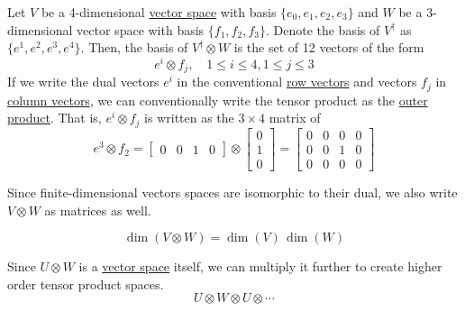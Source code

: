 	\begin{example}
	  \label{ex:4times3-dimensional-tensor-product-space}
		Let $V$ be a 4-dimensional \hyperref[def:vector-space]{vector space} with basis $\{e_0, e_1, e_2, e_3\}$ and $W$ be a 3-dimensional vector space with basis $\{f_1, f_2, f_3\}$. Denote the basis of $V^\dagger$ as $\{e^1, e^2, e^3, e^4\}$. Then, the basis of $V^\dagger \otimes W$ is the set of 12 vectors of the form 
		\begin{equation}
		  e^i \otimes f_j, \quad 1 \leq i \leq 4, 1 \leq j \leq 3
		\end{equation}
		If we write the dual vectors $e^i$ in the conventional \hyperref[def:row-vector]{row vectors} and vectors $f_j$ in \hyperref[def:column-vector]{column vectors}, we can conventionally write the tensor product as the \hyperref[def:outer-product]{outer product}. That is, $e^i \otimes f_j$ is written as the $3 \times 4$ matrix of 
		\begin{equation}
			e^3 \otimes f_2 = \begin{bmatrix} 0 & 0 & 1 & 0 \end{bmatrix} \otimes \begin{bmatrix} 0 \\ 1 \\ 0 \end{bmatrix} = \begin{bmatrix} 
				0 & 0 & 0 & 0 \\ 
				0 & 0 & 1 & 0 \\ 
				0 & 0 & 0 & 0 
			\end{bmatrix}
		\end{equation}
  \end{example}

	Since finite-dimensional vectors spaces are isomorphic to their dual, we also write $V \otimes W$ as matrices as well. 

	\begin{corollary}
	  \label{thm:dimension-of-tensor-product-space}
		\begin{equation}
		  \dim(V \otimes W) = \dim(V) \, \dim(W)
		\end{equation}
	\end{corollary}

  Since $U \otimes W$ is a \hyperref[def:vector-space]{vector space} itself, we can multiply it further to create higher order tensor product spaces. 
	\begin{equation}
  	U \otimes W \otimes U \otimes \cdots
	\end{equation}

